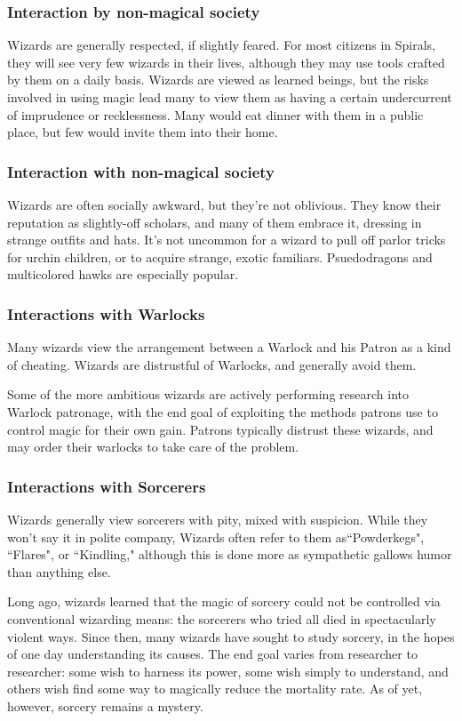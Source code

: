 \begin{multicols}{2}
\subsubsection{Interaction by non-magical society}
Wizards are generally respected, if slightly feared.
For most citizens in Spirals, they will see very few wizards in their lives, although they may use tools crafted by them on a daily basis.
Wizards are viewed as learned beings, but the risks involved in using magic lead many to view them as having a certain undercurrent of imprudence or recklessness.
Many would eat dinner with them in a public place, but few would invite them into their home.

\subsubsection{Interaction with non-magical society}
Wizards are often socially awkward, but they're not oblivious.
They know their reputation as slightly-off scholars, and many of them embrace it, dressing in strange outfits and hats.
It's not uncommon for a wizard to pull off parlor tricks for urchin children, or to acquire strange, exotic familiars.
Psuedodragons and multicolored hawks are especially popular. 

\subsubsection{Interactions with Warlocks}
Many wizards view the arrangement between a Warlock and his Patron as a kind of cheating.
Wizards are distrustful of Warlocks, and generally avoid them.

Some of the more ambitious wizards are actively performing research into Warlock patronage, with the end goal of exploiting the methods patrons use to control magic for their own gain.
Patrons typically distrust these wizards, and may order their warlocks to take care of the problem.

\subsubsection{Interactions with Sorcerers}
Wizards generally view sorcerers with pity, mixed with suspicion.
While they won't say it in polite company, Wizards often refer to them as``Powderkegs", ``Flares", or ``Kindling," although this is done more as sympathetic gallows humor than anything else.

Long ago, wizards learned that the magic of sorcery could not be controlled via conventional wizarding means: the sorcerers who tried all died in spectacularly violent ways.
Since then, many wizards have sought to study sorcery, in the hopes of one day understanding its causes.
The end goal varies from researcher to researcher: some wish to harness its power, some wish simply to understand, and others wish find some way to magically reduce the mortality rate.
As of yet, however, sorcery remains a mystery.


\end{multicols}
